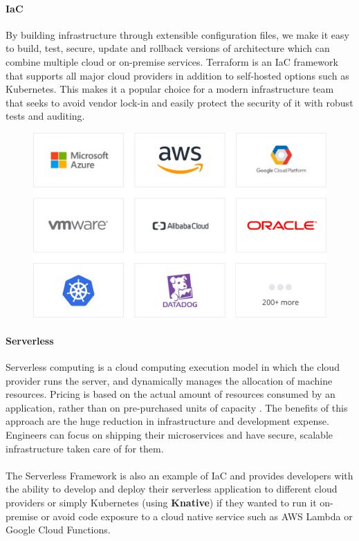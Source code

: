 \documentclass[10pt]{article}
\begin{document}
\paragraph{IaC}
By building infrastructure through extensible configuration files, we make it easy to build, test, secure, update and rollback versions of architecture which can combine multiple cloud or on-premise services. Terraform is an IaC framework that supports all major cloud providers in addition to self-hosted options such as Kubernetes. This makes it a popular choice for a modern infrastructure team that seeks to avoid vendor lock-in and easily protect the security of it with robust tests and auditing.

\begin{figure}[h!]
	\centering
	\includegraphics[width=0.65\linewidth]{images/TerraformProviders.png}	
\end{figure}

\paragraph{Serverless}
Serverless computing is a cloud computing execution model in which the cloud provider runs the server, and dynamically manages the allocation of machine resources. Pricing is based on the actual amount of resources consumed by an application, rather than on pre-purchased units of capacity \parencite{serverless}. The benefits of this approach are the huge reduction in infrastructure and development expense. Engineers can focus on shipping their microservices and have secure, scalable infrastructure taken care of for them.
\\ \\
The Serverless Framework is also an example of IaC and provides developers with the ability to develop and deploy their serverless application to different cloud providers or simply Kubernetes (using \textbf{Knative}) if they wanted to run it on-premise or avoid code exposure to a cloud native service such as AWS Lambda or Google Cloud Functions.
\end{document}
